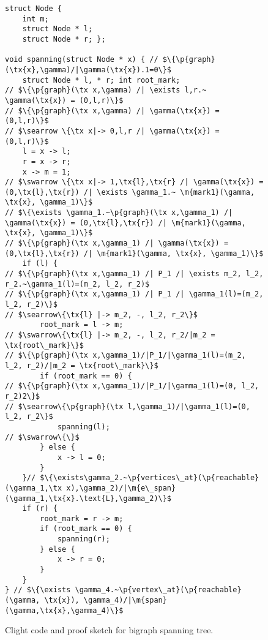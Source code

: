 \begin{figure}
  \begin{lstlisting}
struct Node {
    int m;
    struct Node * l;
    struct Node * r; };

void spanning(struct Node * x) { // $\{\p{graph}(\tx{x},\gamma)/|\gamma(\tx{x}).1=0\}$
    struct Node * l, * r; int root_mark;
// $\{\p{graph}(\tx x,\gamma) /| \exists l,r.~ \gamma(\tx{x}) = (0,l,r)\}$
// $\{\p{graph}(\tx x,\gamma) /| \gamma(\tx{x}) = (0,l,r)\}$
// $\searrow \{\tx x|-> 0,l,r /| \gamma(\tx{x}) = (0,l,r)\}$
    l = x -> l;
    r = x -> r;
    x -> m = 1;
// $\swarrow \{\tx x|-> 1,\tx{l},\tx{r} /| \gamma(\tx{x}) = (0,\tx{l},\tx{r}) /| \exists \gamma_1.~ \m{mark1}(\gamma, \tx{x}, \gamma_1)\}$
// $\{\exists \gamma_1.~\p{graph}(\tx x,\gamma_1) /| \gamma(\tx{x}) = (0,\tx{l},\tx{r}) /| \m{mark1}(\gamma, \tx{x}, \gamma_1)\}$
// $\{\p{graph}(\tx x,\gamma_1) /| \gamma(\tx{x}) = (0,\tx{l},\tx{r}) /| \m{mark1}(\gamma, \tx{x}, \gamma_1)\}$
    if (l) {
// $\{\p{graph}(\tx x,\gamma_1) /| P_1 /| \exists m_2, l_2, r_2.~\gamma_1(l)=(m_2, l_2, r_2)$
// $\{\p{graph}(\tx x,\gamma_1) /| P_1 /| \gamma_1(l)=(m_2, l_2, r_2)\}$
// $\searrow\{\tx{l} |-> m_2, -, l_2, r_2\}$      
        root_mark = l -> m;
// $\swarrow\{\tx{l} |-> m_2, -, l_2, r_2/|m_2 = \tx{root\_mark}\}$
// $\{\p{graph}(\tx x,\gamma_1)/|P_1/|\gamma_1(l)=(m_2, l_2, r_2)/|m_2 = \tx{root\_mark}\}$
        if (root_mark == 0) {
// $\{\p{graph}(\tx x,\gamma_1)/|P_1/|\gamma_1(l)=(0, l_2, r_2)2\}$
// $\searrow\{\p{graph}(\tx l,\gamma_1)/|\gamma_1(l)=(0, l_2, r_2\}$      
            spanning(l);
// $\swarrow\{\}$
        } else {
            x -> l = 0;
        }
    }// $\{\exists\gamma_2.~\p{vertices\_at}(\p{reachable}(\gamma_1,\tx x),\gamma_2)/|\m{e\_span}(\gamma_1,\tx{x}.\text{L},\gamma_2)\}$
    if (r) {
        root_mark = r -> m;
        if (root_mark == 0) {
            spanning(r);
        } else {
            x -> r = 0;
        }
    }
} // $\{\exists \gamma_4.~\p{vertex\_at}(\p{reachable}(\gamma, \tx{x}), \gamma_4)/|\m{span}(\gamma,\tx{x},\gamma_4)\}$
\end{lstlisting}

\caption{Clight code and proof sketch for bigraph spanning tree.}
  
\end{figure}
